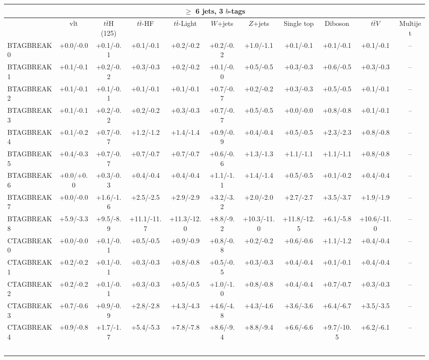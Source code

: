 

\begin{tabular}{l*{10}{c}}
\multicolumn{11}{c}{$\geq$ 6 jets, 3 $b$-tags}\\
\hline\hline
 & vlt & $t\bar{t}$H (125) & $t\bar{t}$-HF & $t\bar{t}$-Light & $W$+jets & $Z$+jets & Single top & Diboson & $t\bar{t}$$V$ & Multijet\\
\hline
BTAGBREAK0 & +0.0/-0.0 & +0.1/-0.1 & +0.1/-0.1 & +0.2/-0.2 & +0.2/-0.2 & +1.0/-1.1 & +0.1/-0.1 & +0.1/-0.1 & +0.1/-0.1 & --\\
BTAGBREAK1 & +0.1/-0.1 & +0.2/-0.2 & +0.3/-0.3 & +0.2/-0.2 & +0.1/-0.0 & +0.5/-0.5 & +0.3/-0.3 & +0.6/-0.5 & +0.3/-0.3 & --\\
BTAGBREAK2 & +0.1/-0.1 & +0.1/-0.1 & +0.1/-0.1 & +0.1/-0.1 & +0.7/-0.7 & +0.2/-0.2 & +0.3/-0.3 & +0.5/-0.5 & +0.1/-0.1 & --\\
BTAGBREAK3 & +0.1/-0.1 & +0.2/-0.2 & +0.2/-0.2 & +0.3/-0.3 & +0.7/-0.7 & +0.5/-0.5 & +0.0/-0.0 & +0.8/-0.8 & +0.1/-0.1 & --\\
BTAGBREAK4 & +0.1/-0.2 & +0.7/-0.7 & +1.2/-1.2 & +1.4/-1.4 & +0.9/-0.9 & +0.4/-0.4 & +0.5/-0.5 & +2.3/-2.3 & +0.8/-0.8 & --\\
BTAGBREAK5 & +0.4/-0.3 & +0.7/-0.7 & +0.7/-0.7 & +0.7/-0.7 & +0.6/-0.6 & +1.3/-1.3 & +1.1/-1.1 & +1.1/-1.1 & +0.8/-0.8 & --\\
BTAGBREAK6 & +0.0/+0.0 & +0.3/-0.3 & +0.4/-0.4 & +0.4/-0.4 & +1.1/-1.1 & +1.4/-1.4 & +0.5/-0.5 & +0.1/-0.2 & +0.4/-0.4 & --\\
BTAGBREAK7 & +0.0/-0.0 & +1.6/-1.6 & +2.5/-2.5 & +2.9/-2.9 & +3.2/-3.2 & +2.0/-2.0 & +2.7/-2.7 & +3.5/-3.7 & +1.9/-1.9 & --\\
BTAGBREAK8 & +5.9/-3.3 & +9.5/-8.9 & +11.1/-11.7 & +11.3/-12.0 & +8.8/-9.2 & +10.3/-11.0 & +11.8/-12.5 & +6.1/-5.8 & +10.6/-11.0 & --\\
CTAGBREAK0 & +0.0/-0.0 & +0.1/-0.1 & +0.5/-0.5 & +0.9/-0.9 & +0.8/-0.8 & +0.2/-0.2 & +0.6/-0.6 & +1.1/-1.2 & +0.4/-0.4 & --\\
CTAGBREAK1 & +0.2/-0.2 & +0.1/-0.1 & +0.3/-0.3 & +0.8/-0.8 & +0.5/-0.5 & +0.3/-0.3 & +0.4/-0.4 & +0.1/-0.1 & +0.4/-0.4 & --\\
CTAGBREAK2 & +0.2/-0.2 & +0.1/-0.1 & +0.3/-0.3 & +0.5/-0.5 & +1.0/-1.0 & +0.8/-0.8 & +0.4/-0.4 & +0.7/-0.7 & +0.3/-0.3 & --\\
CTAGBREAK3 & +0.7/-0.6 & +0.9/-0.9 & +2.8/-2.8 & +4.3/-4.3 & +4.6/-4.8 & +4.3/-4.6 & +3.6/-3.6 & +6.4/-6.7 & +3.5/-3.5 & --\\
CTAGBREAK4 & +0.9/-0.8 & +1.7/-1.7 & +5.4/-5.3 & +7.8/-7.8 & +8.6/-9.4 & +8.8/-9.4 & +6.6/-6.6 & +9.7/-10.5 & +6.2/-6.1 & --\\
$$
\end{tabular}
